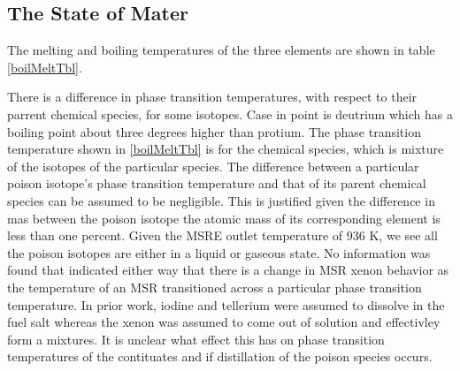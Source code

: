 \subsection{The State of Mater}

 The melting and boiling temperatures of the three elements are shown in table \ref{boilMeltTbl}.  
 
There is a difference in phase transition temperatures, with respect to their parrent chemical species, for some isotopes.  Case in point is deutrium which has a boiling point about three degrees higher than protium. \cite[p. 23]{Goodwin2003} The phase transition temperature shown in \ref{boilMeltTbl} is for the chemical species, which is mixture of the isotopes of the particular species.  The difference between a particular poison isotope's phase transition temperature and that of its parent chemical species can be assumed to be negligible.  This is justified given the difference in mas between the poison isotope the atomic mass of its corresponding element is less than one percent.  Given the MSRE outlet temperature of 936 K, we see all the poison isotopes are either in a liquid or gaseous state.  No information was found that indicated either way that there is a change in MSR xenon behavior as the temperature of an MSR transitioned across a particular phase transition temperature. In prior work, iodine and tellerium were assumed to dissolve in the fuel salt whereas the xenon was assumed to come out of solution and effectivley form a mixtures. It is unclear what effect this has on phase transition temperatures of the contituates and if distillation of the poison species occurs.